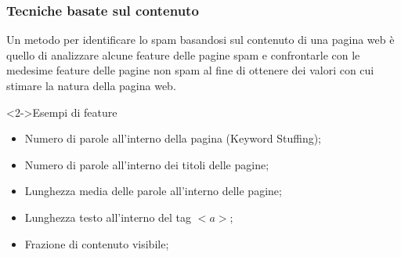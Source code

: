 \documentclass{beamer}
\begin{document}
\begin{frame}
    \frametitle{Tecniche basate sul contenuto}
    Un metodo per identificare lo spam basandosi sul contenuto di una pagina web è  quello di analizzare alcune feature delle pagine spam e confrontarle con le medesime feature delle pagine non spam al fine di ottenere dei valori con cui stimare la natura della pagina web.
    \begin{block}<2->{Esempi di feature}
    \begin{itemize}
    \item Numero di parole all'interno della pagina (Keyword Stuffing);
    \item Numero di parole all'interno dei titoli delle pagine;
    \item Lunghezza media delle parole all'interno delle pagine;
    \item Lunghezza testo all'interno del tag \(<a>\);
    \item Frazione di contenuto visibile;
    \end{itemize}
    \end{block}
\end{frame}
\end{document}
